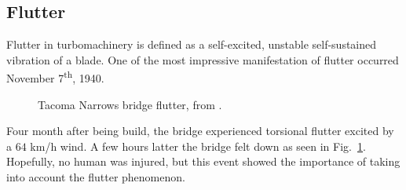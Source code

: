 



\subsection{Flutter}
\label{sub:flutter}

Flutter in turbomachinery is defined as a self-excited, unstable 
self-sustained vibration of a blade. One of the most impressive
manifestation of flutter occurred November 7\textsuperscript{th}, 1940.
\begin{figure}[htb]
  \centering
  \caption{Tacoma Narrows bridge flutter, from \citet{Smith1974}.}
  \label{fig:tacoma_bridge}
\end{figure}
Four month after being build, the bridge experienced 
torsional flutter excited by a $64$ \mbox{km/h} wind.
A few hours latter the bridge felt down as seen in 
Fig.~\ref{fig:tacoma_bridge}. Hopefully, no human
was injured, but this event showed the importance
of taking into account the flutter phenomenon.

